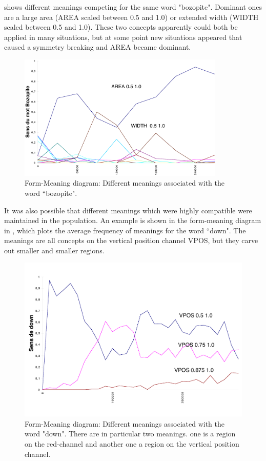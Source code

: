 shows different meanings competing for the same word "bozopite". Dominant ones are 
a large area (AREA scaled between 0.5 and 1.0) or extended width (WIDTH scaled between 0.5 and 1.0). These two concepts
apparently could both be applied in many situations, but at some point new situations appeared that 
caused a symmetry breaking and AREA became dominant. 

\begin{figure}[htbp]
  \centerline{\includegraphics[width=.70\textwidth, height=6cm]{chap8/figures/bozopite}}
\caption{\label{fig:bozopite} 
Form-Meaning diagram: Different meanings associated with the word ``bozopite". 
}
\end{figure}

It was also possible that different meanings which were highly compatible were maintained in the population. 
An example is shown in the form-meaning diagram in , which plots the average 
frequency of meanings for the word ``down". The meanings are all concepts on the vertical position channel 
VPOS, but they carve out smaller and smaller regions. 

\begin{figure}[htbp]
  \centerline{\includegraphics[width=.65\textwidth]{chap8/figures/down}}
\caption{\label{fig:down} 
Form-Meaning diagram: Different meanings associated with the word "down". There are in particular two meanings. 
one is a region on the red-channel and another one a region on the vertical position channel. 
}
\end{figure}

